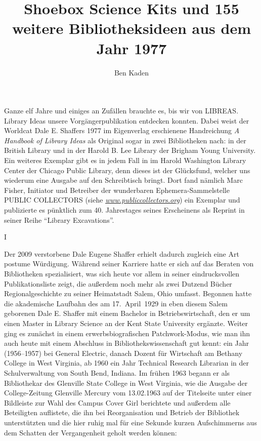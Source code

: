 \documentclass[a4paper,
fontsize=11pt,
oneside,
numbers=noperiodatend,
parskip=half-,
bibliography=totoc,
final
]{scrartcl}
\title{\LARGE{Shoebox Science Kits und 155 weitere Bibliotheksideen aus dem Jahr 1977}} %
\author{Ben Kaden} %
\date{}
\begin{document}
\maketitle
\thispagestyle{fancyplain} 


Ganze elf Jahre und einiges an Zufällen brauchte es, bis wir von
LIBREAS. Library Ideas unsere Vorgängerpublikation entdecken konnten.
Dabei weist der Worldcat Dale E. Shaffers 1977 im Eigenverlag
erschienene Handreichung \emph{A Handbook of Library Ideas} als Original
sogar in zwei Bibliotheken nach: in der British Library und in der
Harold B. Lee Library der Brigham Young University. Ein weiteres
Exemplar gibt es in jedem Fall in im Harold Washington Library Center
der Chicago Public Library, denn dieses ist der Glücksfund, welcher uns
wiederum eine Ausgabe auf den Schreibtisch bringt. Dort fand nämlich
Marc Fisher, Initiator und Betreiber der wunderbaren
Ephemera-Sammelstelle PUBLIC COLLECTORS (siehe
\href{http://www.publiccollectors.org}{\emph{www.publiccollectors.org}})
ein Exemplar und publizierte es pünktlich zum 40. Jahrestages seines
Erscheinens als Reprint in seiner Reihe \enquote{Library Excavations}.

I

Der 2009 verstorbene Dale Eugene Shaffer erhielt dadurch zugleich eine
Art postume Würdigung. Während seiner Karriere hatte er sich auf das
Beraten von Bibliotheken spezialisiert, was sich heute vor allem in
seiner eindrucksvollen Publikationsliste zeigt, die außerdem noch mehr
als zwei Dutzend Bücher Regionalgeschichte zu seiner Heimatstadt Salem,
Ohio umfasst. Begonnen hatte die akademische Laufbahn des am
17.~April~1929 in eben diesem Salem geborenen Dale E. Shaffer mit einem
Bachelor in Betriebswirtschaft, den er um einen Master in Library
Science an der Kent State University ergänzte. Weiter ging es zunächst
in einem erwerbsbiografischen Patchwork-Modus, wie man ihn auch heute
mit einem Abschluss in Bibliothekswissenschaft gut kennt: ein Jahr
(1956--1957) bei General Electric, danach Dozent für Wirtschaft am
Bethany College in West Virginia, ab 1960 ein Jahr Technical Research
Librarian in der Schulverwaltung von South Bend, Indiana. Im frühen 1963
begann er als Bibliothekar des Glenville State College in West Virginia,
wie die Ausgabe der College-Zeitung Glenville Mercury vom 13.02.1963 auf
der Titelseite unter einer Bildleiste zur Wahl des Campus Cover Girl
berichtete und außerdem alle Beteiligten auflistete, die ihn bei
Reorganisation und Betrieb der Bibliothek unterstützten und die hier
ruhig mal für eine Sekunde kurzen Aufschimmerns aus dem Schatten der
Vergangenheit geholt werden können:
\end{document}
